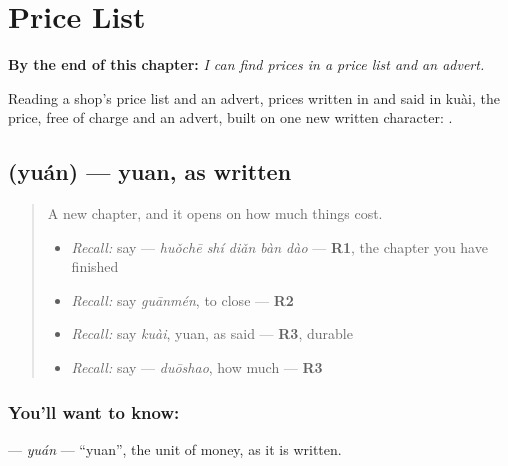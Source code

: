 
\chapter{Price List}
\label{ch:zh-price-list}

\begin{chapteropening}
\textbf{By the end of this chapter:} \emph{I can find prices in a price list and an advert.}

Reading a shop's price list and an advert, prices written in  and said in kuài, the price, free of charge and an advert, built on one new written character: .
\end{chapteropening}

\section[\texorpdfstring{\zh{元} (yuán)}{元 (yuán)}]{ (yuán) — yuan, as written}

\label{lesson:ZH-C156-yuan}



\begin{quote}
A new chapter, and it opens on how much things cost.

\begin{itemize}
\raggedright
  \item \emph{Recall:} say  — \emph{huǒchē shí diǎn bàn dào} — \textbf{R1}, the chapter you have finished
  \item \emph{Recall:} say \emph{guānmén}, to close — \textbf{R2}
  \item \emph{Recall:} say \emph{kuài}, yuan, as said — \textbf{R3}, durable
  \item \emph{Recall:} say  — \emph{duōshao}, how much — \textbf{R3}
\end{itemize}
\end{quote}

\subsection*{You'll want to know: }
\textbf{} — \emph{yuán} — \textquotedblleft{}yuan\textquotedblright{}, the unit of money, as it is written.

